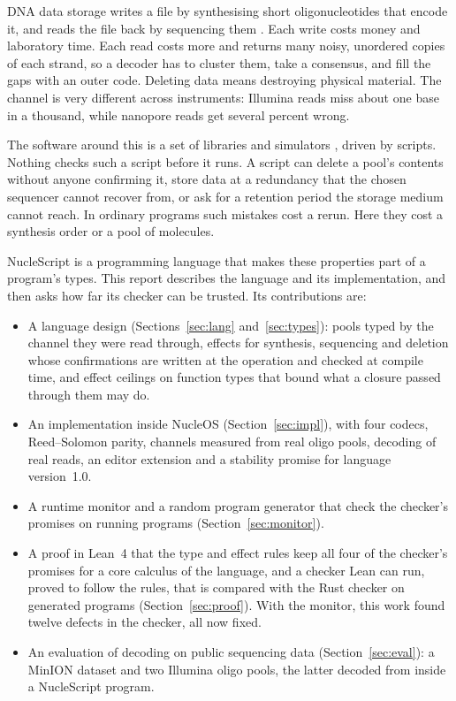\documentclass[11pt,a4paper]{article}
\begin{document}
DNA data storage writes a file by synthesising short oligonucleotides
that encode it, and reads the file back by sequencing them
\cite{church2012,goldman2013,erlich2017,organick2018}. Each write costs
money and laboratory time. Each read costs more and returns many noisy,
unordered copies of each strand, so a decoder has to cluster them, take a
consensus, and fill the gaps with an outer code. Deleting data means
destroying physical material. The channel is very different across
instruments: Illumina reads miss about one base in a thousand, while
nanopore reads get several percent wrong.

The software around this is a set of libraries and simulators
\cite{chamaeleo,mesa,storalator,dnatoolkit}, driven by scripts. Nothing
checks such a script before it runs. A script can delete a pool's
contents without anyone confirming it, store data at a redundancy that
the chosen sequencer cannot recover from, or ask for a retention period
the storage medium cannot reach. In ordinary programs such mistakes cost
a rerun. Here they cost a synthesis order or a pool of molecules.

NucleScript is a programming language that makes these properties part
of a program's types. This
report describes the language and its implementation, and then asks how
far its checker can be trusted. Its contributions are:

\begin{itemize}[leftmargin=*,itemsep=2pt]
\item A language design (Sections~\ref{sec:lang} and~\ref{sec:types}):
  pools typed by the channel they were read through, effects for
  synthesis, sequencing and deletion whose confirmations are written at
  the operation and checked at compile time, and effect ceilings on
  function types that bound what a closure passed through them may do.
\item An implementation inside NucleOS (Section~\ref{sec:impl}), with
  four codecs, Reed--Solomon parity, channels measured from real oligo
  pools, decoding of real reads, an editor extension and a stability
  promise for language version~1.0.
\item A runtime monitor and a random program generator that check the
  checker's promises on running programs (Section~\ref{sec:monitor}).
\item A proof in Lean~4 \cite{lean4} that the type and effect rules
  keep all four of the checker's promises for a core calculus of the
  language, and a checker Lean can run, proved to follow the rules, that
  is compared with the Rust checker on generated programs
  (Section~\ref{sec:proof}). With the monitor, this work found twelve
  defects in the checker, all now fixed.
\item An evaluation of decoding on public sequencing data
  (Section~\ref{sec:eval}): a MinION dataset and two Illumina oligo pools,
  the latter decoded from inside a NucleScript program.
\end{itemize}
\end{document}
